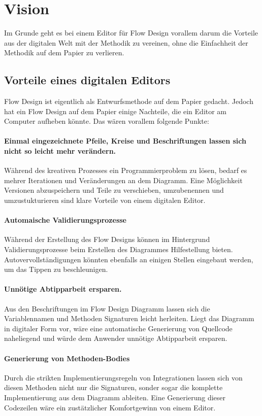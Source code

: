 \documentclass[a4paper,12pt,oneside]{book}
\author{Dennis Müller}
\date{\today}
\title{}
\begin{document}
\chapter{Vision}
\label{sec:orgheadline8}
Im Grunde geht es bei einem Editor für Flow Design vorallem darum die Vorteile aus der digitalen Welt mit
der Methodik zu vereinen, ohne die Einfachheit der Methodik auf dem Papier zu
verlieren. 

\section{Vorteile eines digitalen Editors}
\label{sec:orgheadline6}
Flow Design ist eigentlich als Entwurfsmethode auf dem Papier gedacht.
Jedoch hat ein Flow Design auf dem Papier einige Nachteile, die ein Editor am
Computer aufheben könnte. Das wären vorallem folgende Punkte:
\subsubsection{Einmal eingezeichnete Pfeile, Kreise und Beschriftungen lassen sich nicht so leicht mehr verändern.}
\label{sec:orgheadline1}
Während des kreativen Prozesses ein Programmierproblem zu lösen, bedarf es
mehrer Iterationen und Veränderungen an dem Diagramm. Eine Möglichkeit Versionen
abzuspeichern und Teile zu verschieben, umzubenennen und umzustukturieren sind
klare Vorteile von einem digitalen Editor.
\subsubsection{Automaische Validierungsprozesse}
\label{sec:orgheadline2}
Während der Erstellung des Flow Designs können im Hintergrund
Validierungsprozesse beim Erstellen des Diagrammes Hilfestellung bieten.
Autovervollständigungen könnten ebenfalls an einigen Stellen eingebaut werden,
um das Tippen zu beschleunigen.
\subsubsection{Unnötige Abtipparbeit ersparen.}
\label{sec:orgheadline3}
Aus den Beschriftungen im Flow Design Diagramm lassen sich die Variablennamen und
Methoden Signaturen leicht herleiten. Liegt das Diagramm in digitaler Form vor,
wäre eine automatische Generierung von Quellcode naheliegend und
würde dem Anwender unnötige Abtipparbeit ersparen.
\subsubsection{Generierung von Methoden-Bodies}
\label{sec:orgheadline4}
Durch die strikten Implementierungsregeln von Integrationen lassen sich von
diesen Methoden nicht nur die Signaturen, sonder sogar die komplette Implementierung aus dem Diagramm
ableiten. Eine Generierung dieser Codezeilen wäre ein zustätzlicher Komfortgewinn von einem Editor.
\end{document}
